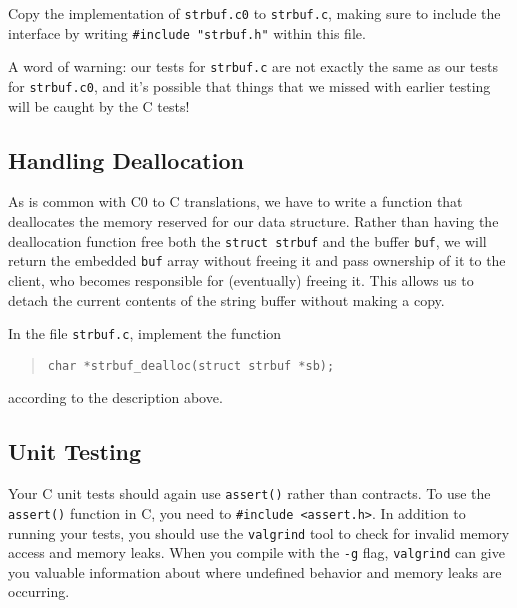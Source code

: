 \documentclass[12pt]{exam}
\begin{document}
\begin{task}[5]
  Copy the implementation of \lstinline'strbuf.c0' to
  \lstinline'strbuf.c', making sure to include the interface by
  writing \lstinline'#include "strbuf.h"' within this file.
\end{task}

A word of warning: our tests for \lstinline'strbuf.c' are not exactly
the same as our tests for \lstinline'strbuf.c0', and it's possible
that things that we missed with earlier testing will be caught by the
C tests!

\subsection{Handling Deallocation}

As is common with C0 to C translations, we have to write a function
that deallocates the memory reserved for our data structure. Rather
than having the deallocation function free both the %
\lstinline'struct strbuf' %
and the buffer \lstinline'buf', we will return the embedded
\lstinline'buf' array without freeing it and pass ownership of it to
the client, who becomes responsible for (eventually) freeing it.  This
allows us to detach the current contents of the string buffer without
making a copy.

\begin{task}[2]
  In the file \lstinline'strbuf.c', implement the function
\begin{quote}
\begin{lstlisting}
char *strbuf_dealloc(struct strbuf *sb);
\end{lstlisting}
\end{quote}
  according to the description above.
\end{task}

\subsection{Unit Testing}

Your C unit tests should again use \lstinline'assert()' rather than
contracts.  To use the \lstinline'assert()' function in C, you need to
\lstinline[deletekeywords={assert}]'#include <assert.h>'.  In addition
to running your tests, you should use the \lstinline'valgrind' tool to
check for invalid memory access and memory leaks. When you compile
with the \lstinline'-g' flag, \lstinline'valgrind' can give you
valuable information about where undefined behavior and memory leaks
are occurring.
\end{document}
